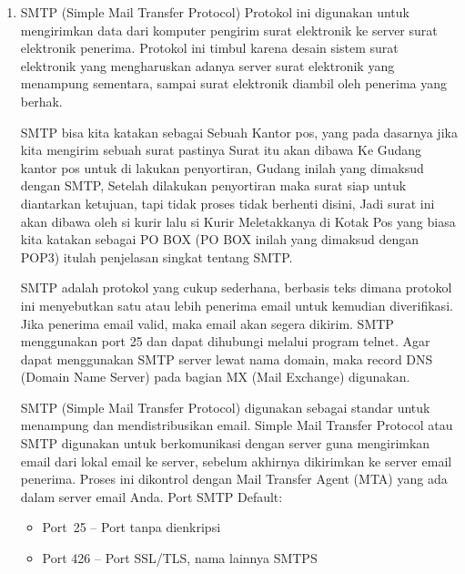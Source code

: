 	\begin{enumerate}
		\item  SMTP (Simple Mail Transfer Protocol) 
		 	Protokol ini digunakan untuk mengirimkan data dari komputer pengirim surat elektronik ke server surat elektronik penerima. Protokol ini timbul karena desain sistem surat elektronik yang mengharuskan adanya server surat elektronik yang menampung sementara, sampai surat elektronik diambil oleh penerima yang berhak.
		 	\par \vspace{12pt}
		 	
		 	SMTP bisa kita katakan sebagai Sebuah Kantor pos, yang pada dasarnya jika kita mengirim sebuah surat pastinya Surat itu akan dibawa Ke Gudang kantor pos untuk di lakukan penyortiran, Gudang inilah yang dimaksud dengan SMTP, Setelah dilakukan penyortiran maka surat siap untuk diantarkan ketujuan, tapi tidak proses tidak berhenti disini, Jadi surat ini akan dibawa oleh si kurir lalu si Kurir Meletakkanya di Kotak Pos yang biasa kita katakan sebagai PO BOX (PO BOX inilah yang dimaksud dengan POP3) itulah penjelasan singkat tentang SMTP.
		 	\par \vspace{12pt}
		 	
		 	SMTP adalah protokol yang cukup sederhana, berbasis teks dimana protokol ini menyebutkan satu atau lebih penerima email untuk kemudian diverifikasi. Jika penerima email valid, maka email akan segera dikirim. SMTP menggunakan port 25 dan dapat dihubungi melalui program telnet. Agar dapat menggunakan SMTP server lewat nama domain, maka record DNS (Domain Name Server) pada bagian MX (Mail Exchange) digunakan.
		 	\par \vspace{12pt}
		 	
		 	SMTP (Simple Mail Transfer Protocol) digunakan sebagai standar untuk menampung dan mendistribusikan email. Simple Mail Transfer Protocol atau SMTP digunakan untuk berkomunikasi dengan server guna mengirimkan email dari lokal email ke server, sebelum akhirnya dikirimkan ke server email penerima. Proses ini dikontrol dengan Mail Transfer Agent (MTA) yang ada dalam server email Anda. Port SMTP Default:
			   
			\begin{itemize}
				\item Port~25 –  Port tanpa dienkripsi
				\item Port 426 – Port SSL/TLS, nama lainnya SMTPS
			\end{itemize}


\end{enumerate}
